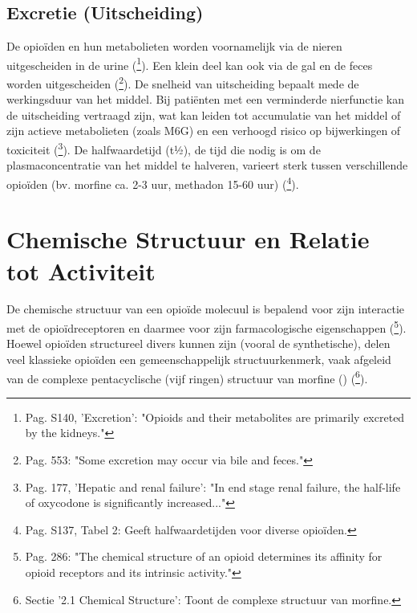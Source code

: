 \documentclass[11pt, a4paper]{report} %
\begin{document}
\subsection{Excretie (Uitscheiding)}
De opioïden en hun metabolieten worden voornamelijk via de nieren uitgescheiden in de urine (\cite{Trescot2008OpioidPharm}\footnote{Pag. S140, 'Excretion': "Opioids and their metabolites are primarily excreted by the kidneys."}). Een klein deel kan ook via de gal en de feces worden uitgescheiden (\cite{GutsteinAkil2006OpioidAnalgesics}\footnote{Pag. 553: "Some excretion may occur via bile and feces."}). De snelheid van uitscheiding bepaalt mede de werkingsduur van het middel. Bij patiënten met een verminderde nierfunctie kan de uitscheiding vertraagd zijn, wat kan leiden tot accumulatie van het middel of zijn actieve metabolieten (zoals M6G) en een verhoogd risico op bijwerkingen of toxiciteit (\cite{Riley2008OxycodoneReview}\footnote{Pag. 177, 'Hepatic and renal failure': "In end stage renal failure, the half-life of oxycodone is significantly increased..."}). De halfwaardetijd (t½), de tijd die nodig is om de plasmaconcentratie van het middel te halveren, varieert sterk tussen verschillende opioïden (bv. morfine ca. 2-3 uur, methadon 15-60 uur) (\cite{Trescot2008OpioidPharm}\footnote{Pag. S137, Tabel 2: Geeft halfwaardetijden voor diverse opioïden.}).

\section{Chemische Structuur en Relatie tot Activiteit}
De chemische structuur van een opioïde molecuul is bepalend voor zijn interactie met de opioïdreceptoren en daarmee voor zijn farmacologische eigenschappen (\cite{Gupta2010ChemistryOpioids}\footnote{Pag. 286: "The chemical structure of an opioid determines its affinity for opioid receptors and its intrinsic activity."}). Hoewel opioïden structureel divers kunnen zijn (vooral de synthetische), delen veel klassieke opioïden een gemeenschappelijk structuurkenmerk, vaak afgeleid van de complexe pentacyclische (vijf ringen) structuur van morfine () (\cite{PubChem-morphine}\footnote{Sectie '2.1 Chemical Structure': Toont de complexe structuur van morfine.}).
\end{document}
